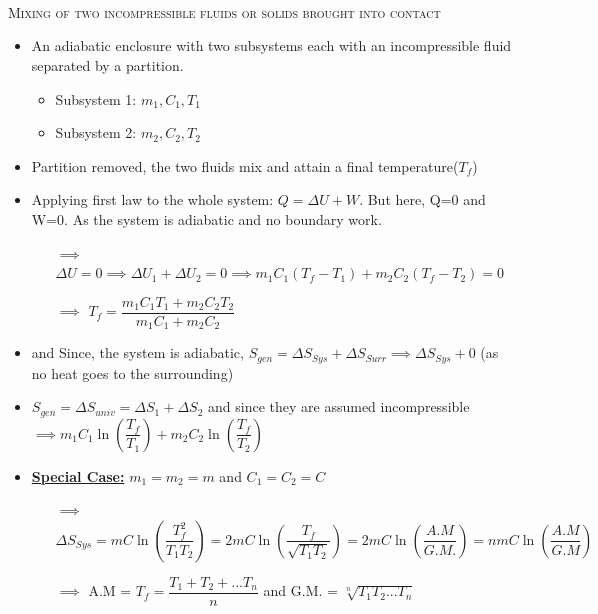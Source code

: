 \documentclass[8pt]{article}
\begin{document}
\\\\\\
		\textsc{Mixing of two incompressible fluids or solids brought into contact}
			\begin{itemize}
				\item An adiabatic enclosure with two subsystems each with an incompressible fluid separated by a partition.
					\begin{itemize}
						\item Subsystem 1: $m_1, C_1, T_1$
						\item Subsystem 2: $m_2, C_2, T_2$
					\end{itemize}
				\item Partition removed, the two fluids mix and attain a final temperature($T_f$)
				\item Applying first law to the whole system: $Q = \Delta U + W$. But here, Q=0 and W=0. As the system is adiabatic and no boundary work. 
					\begin{itemize}
						\item[$\implies$] $\Delta U = 0 \implies \Delta U_1 + \Delta U_2 = 0 \implies m_1C_1(T_f-T_1) + m_2C_2(T_f-T_2) = 0$
						\item[$\implies$] $\boxed{T_f = \dfrac{m_1C_1T_1 + m_2C_2T_2}{m_1C_1 + m_2C_2}}$
					\end{itemize}
				\item and Since, the system is adiabatic, $S_{gen} = \Delta S_{Sys} + \Delta S_{Surr} \implies \Delta S_{Sys} + 0$ (as no heat goes to the surrounding)
				\item $S_{gen} = \Delta S_{univ} = \Delta S_1 + \Delta S_2$ and since they are assumed incompressible $\implies \boxed{m_1C_1\ln\left(\dfrac{T_f}{T_1}\right) + m_2C_2\ln\left(\dfrac{T_f}{T_2}\right)}$
				\item \textbf{\underline{Special Case:}} $\boxed{m_1 = m_2 = m}$ and $\boxed{C_1 = C_2 = C}$
					\begin{itemize}
						\item[$\implies$] $\Delta S_{Sys} = mC\ln\left(\dfrac{T_f^2}{T_1T_2}\right) = 2mC\ln\left(\dfrac{T_f}{\sqrt{T_1T_2}}\right) = 2mC\ln\left(\dfrac{A.M}{G.M.}\right) = nmC\ln\left(\dfrac{A.M}{G.M}\right)$
						\item[$\implies$] A.M = $\boxed{T_f = \dfrac{T_1+T_2+...T_n}{n}}$ and G.M. = $\boxed{\sqrt[n]{T_1T_2...T_n}}$
					\end{itemize}
			\end{itemize}\hrulefill\\\\
\end{document}
